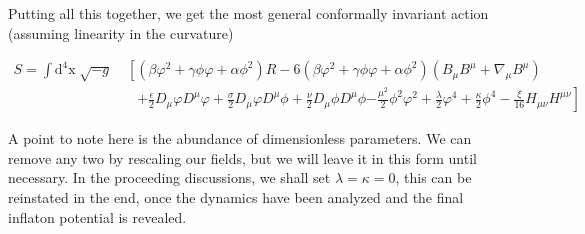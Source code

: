 \documentclass[aps,prd,reprint,preprintnumbers,showpacs,floatfix,nofootinbib,superscript address]{revtex4-2}
\begin{document}
Putting all this together, we get the most general conformally invariant action (assuming linearity in the curvature)
\begin{widetext}
\begin{subequations} \label{28a}
\begin{align}
    S =\int \text{d}^4\text{x} \; \sqrt{-g} &\; \left[ ( \beta \varphi^2 + \gamma \phi \varphi +\alpha \phi^2) R - 6( \beta \varphi^2 + \gamma \phi \varphi +\alpha \phi^2) (B_{\mu} B^{\mu} + \nabla_\mu B^\mu) \right. \nonumber \\
    &\quad \left. +\frac{\epsilon}{2} D_{\mu}\varphi D^{\mu}\varphi + \frac{\sigma}{2} D_{\mu}\varphi D^{\mu}\phi + \frac{\nu}{2} D_{\mu}\phi D^{\mu}\phi \right. \left. - \frac{\mu^2}{2} \phi^2 \varphi^2 + \frac{\lambda}{2} \varphi^4 + \frac{\kappa}{2} \phi^4 - \frac{\xi}{16} H_{\mu\nu}H^{\mu\nu} \right]  
\end{align}
\end{subequations}
\end{widetext}
A point to note here is the abundance of dimensionless parameters. We can remove any two by rescaling our fields, but we will leave it in this form until necessary. In the proceeding discussions, we shall set $\lambda = \kappa = 0$, this can be reinstated in the end, once the dynamics have been analyzed and the final inflaton potential is revealed.
\end{document}
